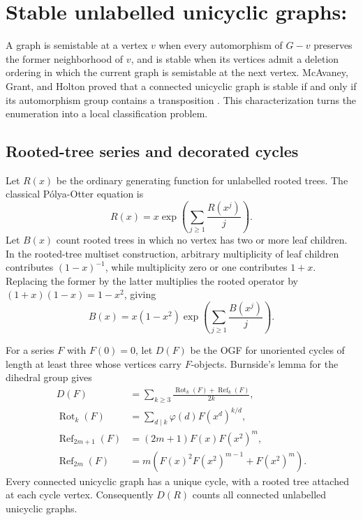 \section{Stable unlabelled unicyclic graphs: \texorpdfstring{}{A006545}}
\label{sec:a006545}

A graph is semistable at a vertex \(v\) when every automorphism of \(G-v\)
preserves the former neighborhood of \(v\), and is stable when its vertices
admit a deletion ordering in which the current graph is semistable at the next
vertex.  McAvaney, Grant, and Holton proved that a connected unicyclic graph is
stable if and only if its automorphism group contains a transposition
\citep{McAvaneyGrantHolton1974,McAvaney1975}.  This characterization turns the
enumeration into a local classification problem.

\subsection{Rooted-tree series and decorated cycles}

Let \(R(x)\) be the ordinary generating function for unlabelled rooted trees.
The classical Pólya-Otter equation is
\begin{equation}
 R(x)=x\exp\left(\sum_{j\ge1}\frac{R(x^j)}{j}\right).
 \label{eq:a006545-R}
\end{equation}
Let \(B(x)\) count rooted trees in which no vertex has two or more leaf
children.  In the rooted-tree multiset construction, arbitrary multiplicity of
leaf children contributes \((1-x)^{-1}\), while multiplicity zero or one
contributes \(1+x\).  Replacing the former by the latter multiplies the rooted
operator by \((1+x)(1-x)=1-x^2\), giving
\begin{equation}
 B(x)=x(1-x^2)\exp\left(\sum_{j\ge1}\frac{B(x^j)}{j}\right).
 \label{eq:a006545-B}
\end{equation}

For a series \(F\) with \(F(0)=0\), let \(D(F)\) be the OGF for unoriented
cycles of length at least three whose vertices carry \(F\)-objects.  Burnside's
lemma for the dihedral group gives
\begin{align}
 D(F)&=\sum_{k\ge3}\frac{\operatorname{Rot}_k(F)+
                              \operatorname{Ref}_k(F)}{2k},
 \label{eq:a006545-D}\\
 \operatorname{Rot}_k(F)&=\sum_{d\mid k}\varphi(d)F(x^d)^{k/d},
 \label{eq:a006545-rot}\\
 \operatorname{Ref}_{2m+1}(F)&=(2m+1)F(x)F(x^2)^m,
 \label{eq:a006545-refodd}\\
 \operatorname{Ref}_{2m}(F)&=m\left(F(x)^2F(x^2)^{m-1}+F(x^2)^m\right).
 \label{eq:a006545-refeven}
\end{align}
Every connected unicyclic graph has a unique cycle, with a rooted tree attached
at each cycle vertex.  Consequently \(D(R)\) counts all connected unlabelled
unicyclic graphs.


